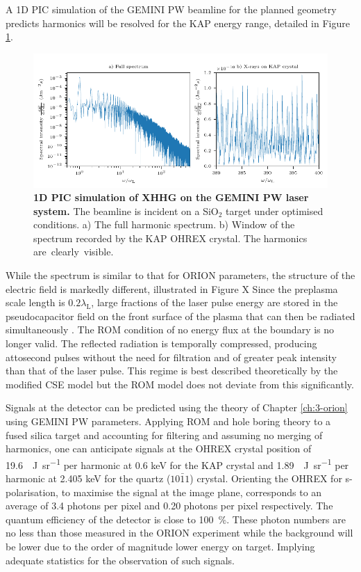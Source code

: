 
A 1D PIC simulation of the GEMINI PW beamline for the planned geometry predicts harmonics will be resolved for the KAP energy range, detailed in Figure \ref{fig:geminixrayharmonics}.
\begin{figure}
	\centering
	\includegraphics{figures/gemini/gemini_xray_harmonics}
	\caption[XHHG on the GEMINI PW laser system.]{\textbf{1D PIC simulation of XHHG on the GEMINI PW laser system.} The beamline is incident on a SiO$_2$ target under optimised conditions. a) The full harmonic spectrum. b) Window of the spectrum recorded by the KAP OHREX crystal. The harmonics are clearly visible.}
	\label{fig:geminixrayharmonics}
\end{figure}
While the spectrum is similar to that for ORION parameters, the structure of the electric field is markedly different, illustrated in Figure X
Since the preplasma scale length is $0.2\lambda_\mathrm{L}$, large fractions of the laser pulse energy are stored in the pseudocapacitor field on the front surface of the plasma that can then be radiated simultaneously \cite{gonoskovUltrarelativisticNanoplasmonicsRoute2011}. The ROM condition of no energy flux at the boundary is no longer valid. The reflected radiation is temporally compressed, producing attosecond pulses without the need for filtration and of greater peak intensity than that of the laser pulse. This regime is best described theoretically by the modified CSE model \cite{edwardsXRayEmissionEffectiveness2020} but the ROM model does not deviate from this significantly.

Signals at the detector can be predicted using the theory of Chapter \ref{ch:3-orion} using GEMINI PW parameters. Applying ROM and hole boring theory to a fused silica target and accounting for filtering and assuming no merging of harmonics, one can anticipate signals at the OHREX crystal position of \qty{19.6}{\mu J.sr^{-1}} per harmonic at 0.6 keV for the KAP crystal and \qty{1.89}{\mu J.sr^{-1}} per harmonic at 2.405 keV for the quartz ($10\bar{1}1$) crystal. Orienting the OHREX for s-polarisation, to maximise the signal at the image plane, corresponds to an average of 3.4 photons per pixel and 0.20 photons per pixel respectively. The quantum efficiency of the detector is close to \qty{100}{\%}. These photon numbers are no less than those measured in the ORION experiment while the background will be lower due to the order of magnitude lower energy on target. Implying adequate statistics for the observation of such signals.

